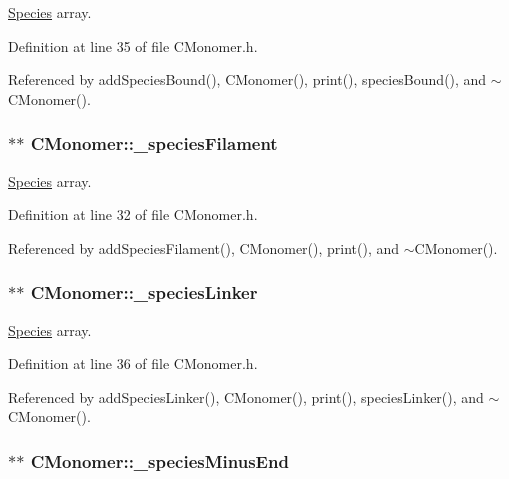 \hyperlink{classSpecies}{Species} array. 



Definition at line 35 of file C\+Monomer.\+h.



Referenced by add\+Species\+Bound(), C\+Monomer(), print(), species\+Bound(), and $\sim$\+C\+Monomer().

\hypertarget{classCMonomer_aa6d658b1fb0e90a549bfc0dedfc3b2a5}{
\subsubsection[{\+\_\+species\+Filament}]{$\ast$$\ast$ C\+Monomer\+::\+\_\+species\+Filament\hspace{0.3cm}{\ttfamily [private]}}}\label{classCMonomer_aa6d658b1fb0e90a549bfc0dedfc3b2a5}


\hyperlink{classSpecies}{Species} array. 



Definition at line 32 of file C\+Monomer.\+h.



Referenced by add\+Species\+Filament(), C\+Monomer(), print(), and $\sim$\+C\+Monomer().

\hypertarget{classCMonomer_aa549a348f1f8e77283c4aaa2e555aca1}{
\subsubsection[{\+\_\+species\+Linker}]{$\ast$$\ast$ C\+Monomer\+::\+\_\+species\+Linker\hspace{0.3cm}{\ttfamily [private]}}}\label{classCMonomer_aa549a348f1f8e77283c4aaa2e555aca1}


\hyperlink{classSpecies}{Species} array. 



Definition at line 36 of file C\+Monomer.\+h.



Referenced by add\+Species\+Linker(), C\+Monomer(), print(), species\+Linker(), and $\sim$\+C\+Monomer().

\hypertarget{classCMonomer_a76ec86baa9b2f8e4711389481b191584}{
\subsubsection[{\+\_\+species\+Minus\+End}]{$\ast$$\ast$ C\+Monomer\+::\+\_\+species\+Minus\+End\hspace{0.3cm}{\ttfamily [private]}}}\label{classCMonomer_a76ec86baa9b2f8e4711389481b191584}


